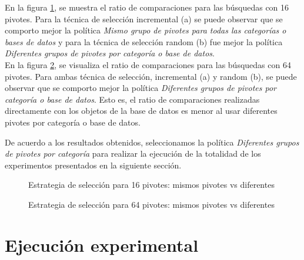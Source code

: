 En la figura \ref{fig:same-vs-diff-16Pivotes}, se muestra el ratio de comparaciones para las b\'usquedas con 16 pivotes. Para la t\'ecnica de selecci\'on incremental (a) se puede observar que se comporto mejor la pol\'itica \textit{Mismo grupo de pivotes para todas las categor\'ias o bases de datos} y para la t\'ecnica de selecci\'on random (b) fue mejor la pol\'itica \textit{Diferentes grupos de pivotes por categor\'ia o base de datos}.\\

En la figura \ref{fig:same-vs-diff-64Pivotes}, se visualiza el ratio de comparaciones para las b\'usquedas con 64 pivotes. Para ambas t\'ecnica de selecci\'on, incremental (a) y random (b), se puede observar que se comporto mejor la pol\'itica \textit{Diferentes grupos de pivotes por categor\'ia o base de datos}. Esto es, el ratio de comparaciones realizadas directamente con los objetos de la base de datos es menor al usar diferentes pivotes por categor\'ia o base de datos.

De acuerdo a los resultados obtenidos, seleccionamos la pol\'itica \textit{Diferentes grupos de pivotes por categor\'ia} para realizar la ejecuci\'on de la totalidad de los experimentos presentados en la siguiente secci\'on.\\

\begin{figure}[tb]
\centering
{}
		\caption{\small Estrategia de selecci\'on para 16 pivotes: mismos pivotes vs diferentes}
		\label{fig:same-vs-diff-16Pivotes}
\end{figure}

\begin{figure}[tb]
\centering
{}
		\caption{\small Estrategia de selecci\'on para 64 pivotes: mismos pivotes vs diferentes}
		\label{fig:same-vs-diff-64Pivotes}
\end{figure}

\section{Ejecuci\'on experimental}

